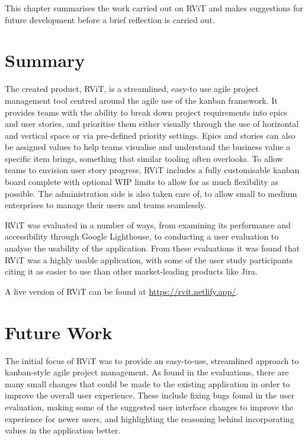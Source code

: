 \documentclass[l4proj.tex]{subfiles}
\begin{document}
  


This chapter summarises the work carried out on RViT and makes suggestions for future development before a brief reflection is carried out. 

\section{Summary}
The created product, RViT, is a streamlined, easy-to use agile project management tool centred around the agile use of the kanban framework. It provides teams with the ability to break down project requirements into epics and user stories, and prioritise them either visually through the use of horizontal and vertical space or via pre-defined priority settings. Epics and stories can also be assigned values to help teams visualise and understand the business value a specific item brings, something that similar tooling often overlooks. To allow teams to envision user story progress, RViT includes a fully customisable kanban board complete with optional WIP limits to allow for as much flexibility as possible. The administration side is also taken care of, to allow small to medium enterprises to manage their users and teams seamlessly.

RViT was evaluated in a number of ways, from examining its performance and accessibility through Google Lighthouse, to conducting a user evaluation to analyse the usability of the application. From these evaluations it was found that RViT was a highly usable application, with some of the user study participants citing it as easier to use than other market-leading products like Jira. 

A live version of RViT can be found at \url{https://rvit.netlify.app/}.

\section{Future Work}
The initial focus of RViT was to provide an easy-to-use, streamlined approach to kanban-style agile project management. As found in the evaluations, there are many small changes that could be made to the existing application in order to improve the overall user experience. These include fixing bugs found in the user evaluation, making some of the suggested user interface changes to improve the experience for newer users, and highlighting the reasoning behind incorporating values in the application better. 
\end{document}

